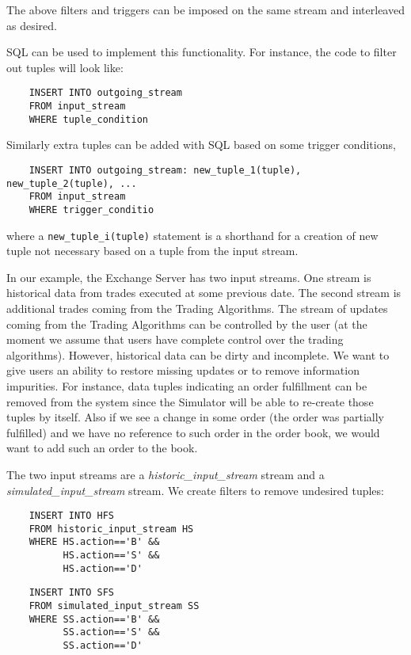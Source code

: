 \documentclass{article}
\begin{document}
\noindent The above filters and triggers can be imposed on the same stream and interleaved as desired.

SQL can be used to implement this functionality. For instance, the code to filter out tuples will look like:

\begin{verbatim}   
    INSERT INTO outgoing_stream
    FROM input_stream
    WHERE tuple_condition
\end{verbatim}

\noindent Similarly extra tuples can be added with SQL based on some trigger conditions,

\begin{verbatim}   
    INSERT INTO outgoing_stream: new_tuple_1(tuple), new_tuple_2(tuple), ...
    FROM input_stream
    WHERE trigger_conditio
\end{verbatim}

\noindent where a {\tt new\_tuple\_i(tuple)} statement is a shorthand for a creation of new tuple not necessary based on a tuple from the input stream.

In our example, the Exchange Server has two input streams. One stream is historical data from trades executed at some previous date. The second stream is additional trades coming from the Trading Algorithms. The stream of updates coming from the Trading Algorithms can be controlled by the user (at the moment we assume that users have complete control over the trading algorithms). However, historical data can be dirty and incomplete. We want to give users an ability to restore missing updates or to remove information impurities. For instance, data tuples indicating an order fulfillment can be removed from the system since the Simulator will be able to re-create those tuples by itself. Also if we see a change in some order (the order was partially fulfilled) and we have no reference to such order in the order book, we would want to add such an order to the book.%

The two input streams  are a \emph{historic\_input\_stream} stream and a \emph{simulated\_input\_stream} stream. We create filters to remove undesired tuples:

\begin{verbatim}   
    INSERT INTO HFS
    FROM historic_input_stream HS
    WHERE HS.action=='B' &&
          HS.action=='S' &&
          HS.action=='D'
\end{verbatim}

\begin{verbatim}  
    INSERT INTO SFS
    FROM simulated_input_stream SS
    WHERE SS.action=='B' &&
          SS.action=='S' &&
          SS.action=='D'
\end{verbatim}
\end{document}
